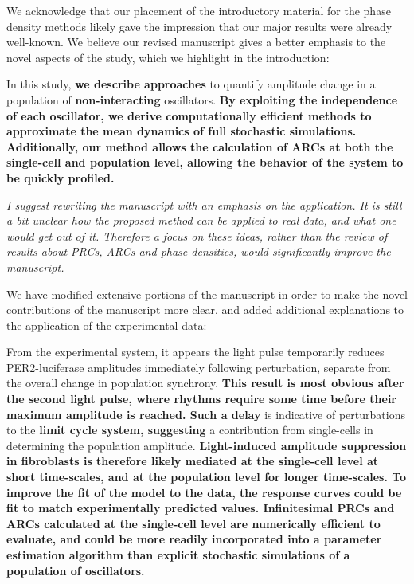 \documentclass[11pt, letterpaper]{article}
\newenvironment{reviewer}{\itshape\color{gray}}{}
\newenvironment{manuscript}[1]{\begin{center}\begin{tcolorbox}[colback=green!5!white,colframe=green!75!black,width=0.8\textwidth,title={#1},breakable,fonttitle=\bfseries]}{\end{tcolorbox}\end{center}}
\begin{document}
We acknowledge that our placement of the introductory material for the phase density methods likely gave the impression that our major results were already well-known.
We believe our revised manuscript gives a better emphasis to the novel aspects of the study, which we highlight in the introduction:

\begin{manuscript}{Page 4}
In this study, {\bfseries we describe approaches} to quantify amplitude change in a population of {\bfseries non-interacting} oscillators.
{\bfseries By exploiting the independence of each oscillator, we derive computationally efficient methods to approximate the mean dynamics of full stochastic simulations.
Additionally, our method allows the calculation of ARCs at both the single-cell and population level, allowing the behavior of the system to be quickly profiled.}
\end{manuscript}

\begin{reviewer}
I suggest rewriting the manuscript with an emphasis on the application.
It is still a bit unclear how the proposed method can be applied to real data, and what one would get out of it.
Therefore a focus on these ideas, rather than the review of results about PRCs, ARCs and phase densities, would significantly improve the manuscript.
\end{reviewer}
 
We have modified extensive portions of the manuscript in order to make the novel contributions of the manuscript more clear, and added additional explanations to the application of the experimental data:

\begin{manuscript}{Page 16}
From the experimental system, it appears the light pulse temporarily reduces PER2-luciferase amplitudes immediately following perturbation, separate from the overall change in population synchrony.
{\bfseries This result is most obvious after the second light pulse, where rhythms require some time before their maximum amplitude is reached.
Such a delay} is indicative of perturbations to the {\bfseries limit cycle system, suggesting} a contribution from single-cells in determining the population amplitude.
{\bfseries Light-induced amplitude suppression in fibroblasts is therefore likely mediated at the single-cell level at short time-scales, and at the population level for longer time-scales.
To improve the fit of the model to the data, the response curves could be fit to match experimentally predicted values.
Infinitesimal PRCs and ARCs calculated at the single-cell level are numerically efficient to evaluate, and could be more readily incorporated into a parameter estimation algorithm than explicit stochastic simulations of a population of oscillators.}
\end{manuscript}
\end{document}
